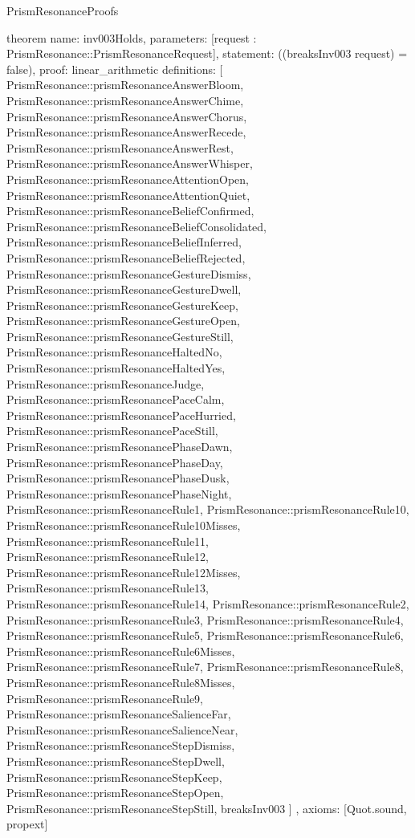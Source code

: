 \begin{lexlean}{PrismResonanceProofs}
\begin{semanticmodule}
theorem{
  name: inv003Holds,
  parameters: [request : PrismResonance::PrismResonanceRequest],
  statement: ((breaksInv003 request) = false),
  proof: linear_arithmetic{
    definitions: [
      PrismResonance::prismResonanceAnswerBloom,
      PrismResonance::prismResonanceAnswerChime,
      PrismResonance::prismResonanceAnswerChorus,
      PrismResonance::prismResonanceAnswerRecede,
      PrismResonance::prismResonanceAnswerRest,
      PrismResonance::prismResonanceAnswerWhisper,
      PrismResonance::prismResonanceAttentionOpen,
      PrismResonance::prismResonanceAttentionQuiet,
      PrismResonance::prismResonanceBeliefConfirmed,
      PrismResonance::prismResonanceBeliefConsolidated,
      PrismResonance::prismResonanceBeliefInferred,
      PrismResonance::prismResonanceBeliefRejected,
      PrismResonance::prismResonanceGestureDismiss,
      PrismResonance::prismResonanceGestureDwell,
      PrismResonance::prismResonanceGestureKeep,
      PrismResonance::prismResonanceGestureOpen,
      PrismResonance::prismResonanceGestureStill,
      PrismResonance::prismResonanceHaltedNo,
      PrismResonance::prismResonanceHaltedYes,
      PrismResonance::prismResonanceJudge,
      PrismResonance::prismResonancePaceCalm,
      PrismResonance::prismResonancePaceHurried,
      PrismResonance::prismResonancePaceStill,
      PrismResonance::prismResonancePhaseDawn,
      PrismResonance::prismResonancePhaseDay,
      PrismResonance::prismResonancePhaseDusk,
      PrismResonance::prismResonancePhaseNight,
      PrismResonance::prismResonanceRule1,
      PrismResonance::prismResonanceRule10,
      PrismResonance::prismResonanceRule10Misses,
      PrismResonance::prismResonanceRule11,
      PrismResonance::prismResonanceRule12,
      PrismResonance::prismResonanceRule12Misses,
      PrismResonance::prismResonanceRule13,
      PrismResonance::prismResonanceRule14,
      PrismResonance::prismResonanceRule2,
      PrismResonance::prismResonanceRule3,
      PrismResonance::prismResonanceRule4,
      PrismResonance::prismResonanceRule5,
      PrismResonance::prismResonanceRule6,
      PrismResonance::prismResonanceRule6Misses,
      PrismResonance::prismResonanceRule7,
      PrismResonance::prismResonanceRule8,
      PrismResonance::prismResonanceRule8Misses,
      PrismResonance::prismResonanceRule9,
      PrismResonance::prismResonanceSalienceFar,
      PrismResonance::prismResonanceSalienceNear,
      PrismResonance::prismResonanceStepDismiss,
      PrismResonance::prismResonanceStepDwell,
      PrismResonance::prismResonanceStepKeep,
      PrismResonance::prismResonanceStepOpen,
      PrismResonance::prismResonanceStepStill,
      breaksInv003
    ]
  },
  axioms: [Quot.sound, propext]
}


\end{semanticmodule}
\end{lexlean}
